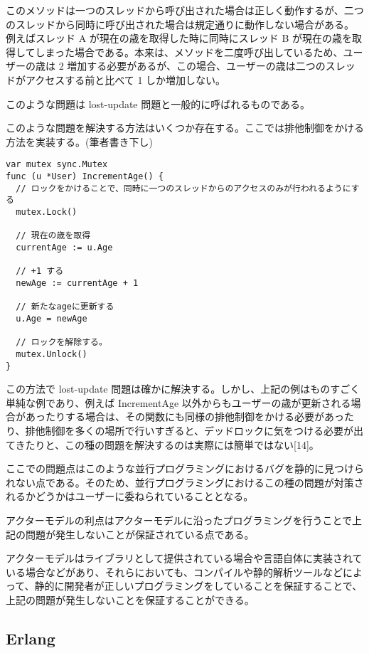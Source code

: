 このメソッドは一つのスレッドから呼び出された場合は正しく動作するが、二つのスレッドから同時に呼び出された場合は規定通りに動作しない場合がある。
例えばスレッド A が現在の歳を取得した時に同時にスレッド B
が現在の歳を取得してしまった場合である。本来は、メソッドを二度呼び出しているため、ユーザーの歳は
2
増加する必要があるが、この場合、ユーザーの歳は二つのスレッドがアクセスする前と比べて
1 しか増加しない。

このような問題は lost-update 問題と一般的に呼ばれるものである。

このような問題を解決する方法はいくつか存在する。ここでは排他制御をかける方法を実装する。(筆者書き下し)

\begin{verbatim}
var mutex sync.Mutex
func (u *User) IncrementAge() {
  // ロックをかけることで、同時に一つのスレッドからのアクセスのみが行われるようにする
  mutex.Lock()

  // 現在の歳を取得
  currentAge := u.Age

  // +1 する
  newAge := currentAge + 1

  // 新たなageに更新する
  u.Age = newAge

  // ロックを解除する。
  mutex.Unlock()
}
\end{verbatim}

この方法で lost-update
問題は確かに解決する。しかし、上記の例はものすごく単純な例であり、例えば
IncrementAge
以外からもユーザーの歳が更新される場合があったりする場合は、その関数にも同様の排他制御をかける必要があったり、排他制御を多くの場所で行いすぎると、デッドロックに気をつける必要が出てきたりと、この種の問題を解決するのは実際には簡単ではない{[}14{]}。

ここでの問題点はこのような並行プログラミングにおけるバグを静的に見つけられない点である。そのため、並行プログラミングにおけるこの種の問題が対策されるかどうかはユーザーに委ねられていることとなる。

アクターモデルの利点はアクターモデルに沿ったプログラミングを行うことで上記の問題が発生しないことが保証されている点である。

アクターモデルはライブラリとして提供されている場合や言語自体に実装されている場合などがあり、それらにおいても、コンパイルや静的解析ツールなどによって、静的に開発者が正しいプログラミングをしていることを保証することで、上記の問題が発生しないことを保証することができる。

\subsection{Erlang}

